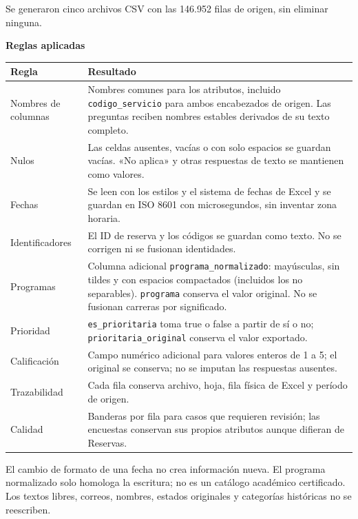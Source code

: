 \documentclass[11pt,letterpaper]{article}
\begin{document}
Se generaron cinco archivos CSV con las 146.952 filas de origen, sin eliminar ninguna.

\textbf{Reglas aplicadas}

\begingroup\small\setlength{\tabcolsep}{4pt}\renewcommand{\arraystretch}{1.15}
\begin{longtable}{>{\raggedright\arraybackslash}p{}>{\raggedright\arraybackslash}p{}}
\toprule
\textbf{Regla} & \textbf{Resultado} \\
\midrule
\endhead
Nombres de columnas & Nombres comunes para los atributos, incluido \texttt{codigo\_\allowbreak{}servicio} para ambos encabezados de origen. Las preguntas reciben nombres estables derivados de su texto completo. \\
Nulos & Las celdas ausentes, vacías o con solo espacios se guardan vacías. «No aplica» y otras respuestas de texto se mantienen como valores. \\
Fechas & Se leen con los estilos y el sistema de fechas de Excel y se guardan en ISO 8601 con microsegundos, sin inventar zona horaria. \\
Identificadores & El ID de reserva y los códigos se guardan como texto. No se corrigen ni se fusionan identidades. \\
Programas & Columna adicional \texttt{programa\_\allowbreak{}normalizado}: mayúsculas, sin tildes y con espacios compactados (incluidos los no separables). \texttt{programa} conserva el valor original. No se fusionan carreras por significado. \\
Prioridad & \texttt{es\_\allowbreak{}prioritaria} toma true o false a partir de sí o no; \texttt{prioritaria\_\allowbreak{}original} conserva el valor exportado. \\
Calificación & Campo numérico adicional para valores enteros de 1 a 5; el original se conserva; no se imputan las respuestas ausentes. \\
Trazabilidad & Cada fila conserva archivo, hoja, fila física de Excel y período de origen. \\
Calidad & Banderas por fila para casos que requieren revisión; las encuestas conservan sus propios atributos aunque difieran de Reservas. \\
\bottomrule
\end{longtable}
\endgroup


El cambio de formato de una fecha no crea información nueva. El programa normalizado solo homologa la escritura; no es un catálogo académico certificado. Los textos libres, correos, nombres, estados originales y categorías históricas no se reescriben.
\end{document}
